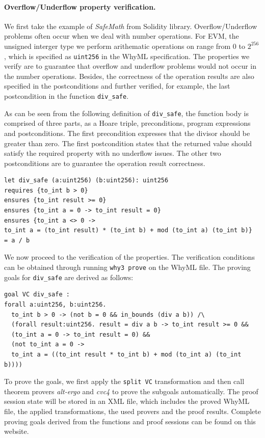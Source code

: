 \documentclass[runningheads]{llncs}
\newcommand {\xy} {\color{purple}}
\begin{document}
{\xy
\paragraph{Overflow/Underflow property verification.}
We first take the example of \emph{SafeMath} from Solidity 
library. Overflow/Underflow problems often occur when we deal with number operations. For EVM, the unsigned interger type we 
perform arithematic operations on range from 0 to $2^{256}$, which is specified as \texttt{uint256} in the WhyML specification.
The properties we verify are to guarantee that overflow and underflow problems would not occur in the number operations.
Besides, the correctness of the operation results are also specified in the postconditions and further verified, for example,
the last postcondition in the function \texttt{div\_safe}. 

As can be seen from the following definition of \texttt{div\_safe},
the function body is comprised of three parts, as a Hoare triple, 
preconditions, program expressions and postconditions.
The first precondition expresses that the divisor should be greater than
zero. The first postcondition states that the returned value should
satisfy the required property with no underflow issues. The other
two postconditions are to guarantee the operation result correctness. 
\begin{verbatim}
let div_safe (a:uint256) (b:uint256): uint256
requires {to_int b > 0}
ensures {to_int result >= 0}
ensures {to_int a = 0 -> to_int result = 0}
ensures {to_int a <> 0 -> 
to_int a = (to_int result) * (to_int b) + mod (to_int a) (to_int b)}
= a / b
\end{verbatim}

We now proceed to the verification of the properties. The verification conditions can be obtained 
through running \texttt{why3 prove} on the WhyML file. 
The proving goals for \texttt{div\_safe} are derived as follows:

\begin{verbatim}
goal VC div_safe :
forall a:uint256, b:uint256.
  to_int b > 0 -> (not b = 0 && in_bounds (div a b)) /\
  (forall result:uint256. result = div a b -> to_int result >= 0 &&
  (to_int a = 0 -> to_int result = 0) &&
  (not to_int a = 0 ->
  to_int a = ((to_int result * to_int b) + mod (to_int a) (to_int b))))
\end{verbatim}
To prove the goals, we first apply the \texttt{split VC} transformation and 
then call theorem provers \emph{alt-ergo} and \emph{cvc4} 
to prove the subgoals automatically. The proof session state will be 
stored in an XML file, which includes the proved WhyML file, the applied
transformations, the used provers and the proof results.
Complete proving goals derived from the functions and 
proof sessions can be found on this website.
}
\end{document}

